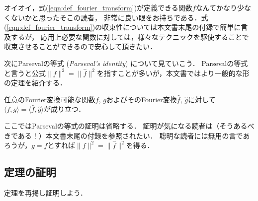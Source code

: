 オイオイ，式(\ref{eqn:def_fourier_transform})が定義できる関数$f$なんてかなり少なくないかと思ったそこの読者，
非常に良い眼をお持ちである．式(\ref{eqn:def_fourier_transform})の収束性については本文書末尾の付録で簡単に言及するが，
応用上必要な関数に対しては，様々なテクニックを駆使することで収束させることができるので安心して頂きたい．

次にParsevalの等式 (\textit{Parseval's identity}) について見ていこう．
Parsevalの等式と言うと公式$\|f\|^2 = \|\widehat{f}\|^2$を指すことが多いが，本文書ではより一般的な形の定理を紹介する．

\begin{theorem}[Parsevalの等式]
    任意のFourier変換可能な関数$f$, $g$およびそのFourier変換$\widehat{f}$, $\widehat{g}$に対して
    $\langle f, g \rangle = \langle \widehat{f}, \widehat{g} \rangle$が成り立つ．
\end{theorem}

ここではParsevalの等式の証明は省略する．
証明が気になる読者は（そうあるべきである！）本文書末尾の付録を参照されたい．
聡明な読者には無用の言であろうが，$g = f$とすれば$\|f\|^2 = \|\widehat{f}\|^2$を得る．

\subsection*{定理の証明}

定理を再掲し証明しよう．

